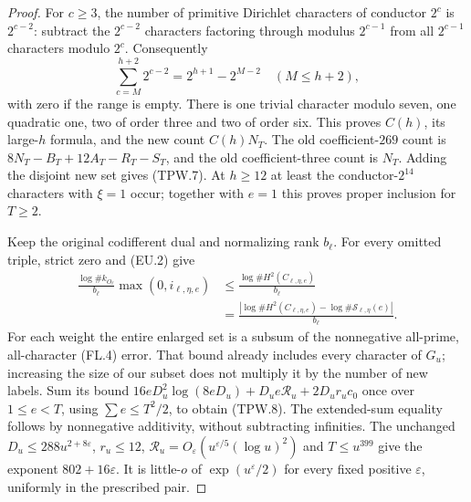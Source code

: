 \begin{proof}
For $c\geq3$, the number of primitive Dirichlet characters of conductor
$2^c$ is $2^{c-2}$: subtract the $2^{c-2}$ characters factoring through
modulus $2^{c-1}$ from all $2^{c-1}$ characters modulo $2^c$.
Consequently
\[
 \sum_{c=M}^{h+2}2^{c-2}=2^{h+1}-2^{M-2}
 \quad(M\leq h+2),
 \tag{TPW.10}
\]
with zero if the range is empty.  There is one trivial character modulo
seven, one quadratic one, two of order three and two of order six.
This proves $C(h)$, its large-$h$ formula, and the new count $C(h)N_T$.
The old coefficient-$269$ count is $8N_T-B_T+12A_T-R_T-S_T$,
and the old coefficient-three count is $N_T$.
Adding the disjoint new set gives (TPW.7).
At $h\geq12$ at least the conductor-$2^{14}$ characters with $\xi=1$
occur; together with $e=1$ this proves proper inclusion for $T\geq2$.

Keep the original codifferent dual and normalizing rank $b_\ell$.
For every omitted triple, strict zero and (EU.2) give
\[
 \begin{aligned}
 \frac{\log\#k_{O_\ell}}{b_\ell}\max(0,i_{\ell,\eta,e})
 &\leq\frac{\log\#H^2(C_{\ell,\eta,e})}{b_\ell}\\
 &=\frac{\left|\log\#H^2(C_{\ell,\eta,e})
                  -\log\#\mathcal S_{\ell,\eta}(e)\right|}{b_\ell}.
 \end{aligned}
 \tag{TPW.11}
\]
For each weight the entire enlarged set is a subsum of the nonnegative
all-prime, all-character (FL.4) error.  That bound already includes
every character of $G_u$; increasing the size of our subset does not
multiply it by the number of new labels.
Sum its bound $16eD_u^2\log(8eD_u)+D_ue\mathcal R_u+2D_ur_uc_0$
once over $1\leq e<T$, using $\sum e\leq T^2/2$, to obtain (TPW.8).
The extended-sum equality follows by nonnegative additivity, without
subtracting infinities.
The unchanged $D_u\leq288u^{2+8\varepsilon}$, $r_u\leq12$,
$\mathcal R_u=O_\varepsilon(u^{\varepsilon/5}(\log u)^2)$ and
$T\leq u^{399}$ give the exponent $802+16\varepsilon$.
It is little-$o$ of $\exp(u^\varepsilon/2)$ for every fixed positive
$\varepsilon$, uniformly in the prescribed pair.


\end{proof}
